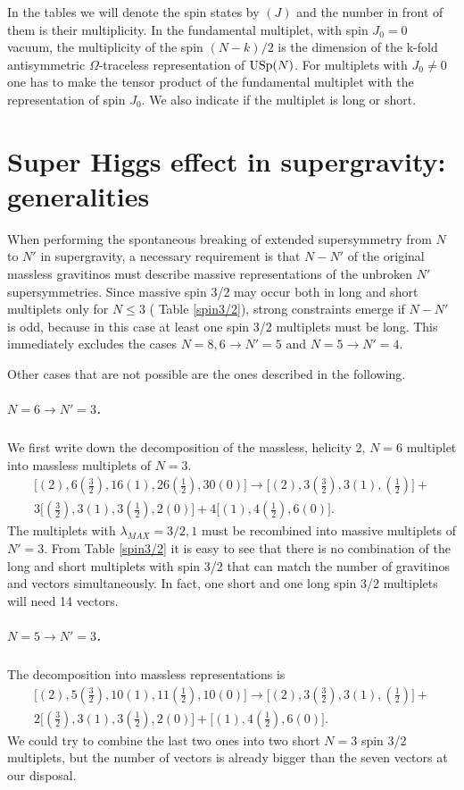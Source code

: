 \documentclass[a4paper,12pt]{article}
\begin{document}
In the tables we will denote the spin states by $(J)$ and the
number in front of them is their multiplicity. In the fundamental
multiplet, with spin $J_0=0$ vacuum, the multiplicity of the spin
$(N-k)/2$  is the dimension of the  k-fold antisymmetric
$\Omega$-traceless  representation of $\mathrm{USp}(N)$. For multiplets
with $J_0\neq 0$ one has to make the tensor product of the
fundamental multiplet with the representation of spin $J_0$. We
also indicate if the multiplet is long or short.



\section{Super Higgs effect in supergravity: generalities}
When performing the  spontaneous breaking  of extended
supersymmetry from $N$ to $N'$  in supergravity, a necessary
requirement is that $N-N'$ of the original massless gravitinos
must describe massive representations of the unbroken $N'$
supersymmetries. Since massive spin 3/2 may occur both in long and
short multiplets only  for $N\leq 3$ ( Table \ref{spin3/2}),
strong constraints emerge if $N-N'$ is odd, because in this case
at least one spin 3/2 multiplets must be long. This immediately
excludes the cases $N=8,6\rightarrow N'=5$ and $N=5\rightarrow
N'=4$.

Other cases that are not possible are the ones described in the following.

\subparagraph{$N=6\rightarrow N'=3$.} We first write down the
decomposition of the massless, helicity 2, $N=6$ multiplet into
massless multiplets of $N=3$.
\begin{eqnarray*}\bigl[ (2), 6(\frac{3}{2}), 16 (1), 26(\frac{1}{2}), 30(0)\bigr]\rightarrow
\bigl[ (2), 3(\frac{3}{2}), 3(1), (\frac{1}{2})\bigr]+\\ 3\bigl[
(\frac{3}{2}), 3(1), 3(\frac{1}{2}), 2(0)\bigr]+4\bigl[ (1),
4(\frac{1}{2}), 6(0)\bigr].\end{eqnarray*} The multiplets with
$\lambda_{MAX}=3/2,1$ must be recombined into massive multiplets
of $N'=3$.
 From Table \ref{spin3/2} it is easy to see that there is no combination of the long and short
 multiplets with spin 3/2 that can match the number of gravitinos and vectors simultaneously. In fact,
 one short and one long spin 3/2 multiplets will need 14 vectors.

\subparagraph{$N=5\rightarrow N'=3$.}The decomposition into massless representations is
\begin{eqnarray*}\bigl[ (2), 5(\frac{3}{2}), 10 (1), 11(\frac{1}{2}), 10(0)\bigr]\rightarrow
\bigl[ (2), 3(\frac{3}{2}), 3(1), (\frac{1}{2})\bigr]+\\ 2\bigl[
(\frac{3}{2}), 3(1), 3(\frac{1}{2}), 2(0)\bigr]+\bigl[ (1),
4(\frac{1}{2}), 6(0)\bigr].\end{eqnarray*} We could try to combine
the last two ones into two short $N=3$ spin 3/2 multiplets,  but
the number of vectors is already bigger than the seven vectors at
our disposal.
\end{document}
